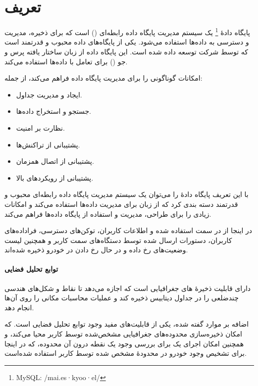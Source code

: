 
\label{chap3}

\section{تعریف}\label{sec1:chap3}

پایگاه دادهٔ
\footnote{MySQL:‌ \TNR/mai.es·kyoo·el/}
 یک سیستم مدیریت پایگاه داده رابطه‌ای () است که برای ذخیره، مدیریت و دسترسی به داده‌ها استفاده می‌شود.  یکی از پایگاه‌های داده محبوب و قدرتمند است که توسط شرکت  توسعه داده شده است. این پایگاه داده از زبان ساختار یافته پرس و جو () برای تعامل با داده‌ها استفاده می‌کند.

 امکانات گوناگونی را برای مدیریت پایگاه داده فراهم می‌کند، از جمله:

\begin{itemize}[nosep]
	\def\labelenumi{\arabic{enumi}.}

	\item
	ایجاد و مدیریت جداول.
	\item
	جستجو و استخراج داده‌ها.
	\item
	نظارت بر امنیت.
	\item
	پشتیبانی از تراکنش‌ها.
	\item
	پشتیبانی از اتصال همزمان.
	\item
	پشتیبانی از رویکردهای بالا.
\end{itemize}

با این تعریف پایگاه دادهٔ  را می‌توان یک سیستم مدیریت پایگاه داده
رابطه‌ای محبوب و قدرتمند دسته بندی کرد که از زبان  برای مدیریت داده‌ها
استفاده می‌کند و امکانات زیادی را برای طراحی، مدیریت و استفاده از پایگاه
داده‌ها فراهم می‌کند.

در اینجا از  در سمت  استفاده شده و اطلاعات کاربران، توکن‌های
دسترسی، فراداده‌های کاربران، دستورات ارسال شده توسط دستگاه‌های سمت کاربر و
همچنین لیست وضعیت‌های رخ داده و در حال رخ دادن در خودرو ذخیره شده‌اند.


\paragraph{توابع تحلیل فضایی}\label{par1:sec1:chap3}

 دارای قابلیت ذخیرهٔ های جغرافیایی است که اجازه می‌دهد تا
نقاط و شکل‌های هندسی چندضلعی را در جداول دیتابیس ذخیره کند و عملیات
محاسبات مکانی را روی آن‌ها انجام دهد.

اضافه بر موارد گفته شده، یکی از قابلیت‌های مفید  وجود توابع تحلیل
فضایی
 است. که امکان ذخیره‌سازی محدوده‌های
جغرافیایی مشخص‌شده توسط کاربر محیا می‌کند، و همچنین امکان اجرای یک 
برای بررسی وجود یک نقطه درون آن محدوده، که در اینجا برای تشخیص وجود
خودرو در محدودهٔ مشخص شده توسط کاربر استفاده شده‌است.

